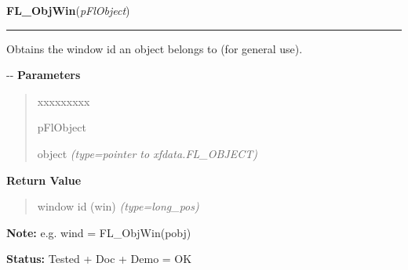 \hspace{.8\funcindent}\begin{boxedminipage}{\funcwidth}

    \raggedright \textbf{FL\_ObjWin}(\textit{pFlObject})

    \vspace{-1.5ex}

    \rule{\textwidth}{0.5\fboxrule}
\setlength{\parskip}{2ex}

Obtains the window id an object belongs to (for general use).

-{}-
\setlength{\parskip}{1ex}
      \textbf{Parameters}
      \vspace{-1ex}

      \begin{quote}
        \begin{Ventry}{xxxxxxxxx}

          \item[pFlObject]


object
            {\it (type=pointer to xfdata.FL\_OBJECT)}

        \end{Ventry}

      \end{quote}

      \textbf{Return Value}
    \vspace{-1ex}

      \begin{quote}

window id (win)
      {\it (type=long\_pos)}

      \end{quote}

\textbf{Note:} 
e.g. wind = FL\_ObjWin(pobj)


\textbf{Status:} 
Tested + Doc + Demo = OK


    \end{boxedminipage}

    \label{xformslib:flxbasic:fl_get_real_object_window}

    \vspace{0.5ex}

